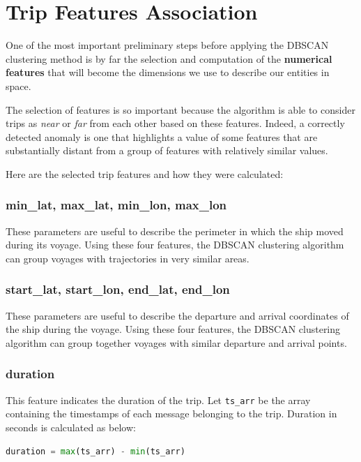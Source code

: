 \section{Trip Features Association}
    One of the most important preliminary steps before applying the DBSCAN clustering method is by far the selection and computation of the \textbf{numerical features} that will become the dimensions we use to describe our entities in space.
     
    The selection of features is so important because the algorithm is able to consider trips as \textit{near} or \textit{far} from each other based on these features. Indeed, a correctly detected anomaly is one that highlights a value of some features that are substantially distant from a group of features with relatively similar values.
    
    Here are the selected trip features and how they were calculated:
    
    \subsubsection{min\_lat, max\_lat, min\_lon, max\_lon}
        These parameters are useful to describe the perimeter in which the ship moved during its voyage. Using these four features, the DBSCAN clustering algorithm can group voyages with trajectories in very similar areas.
    
    \subsubsection{start\_lat, start\_lon, end\_lat, end\_lon}
        These parameters are useful to describe the departure and arrival coordinates of the ship during the voyage. Using these four features, the DBSCAN clustering algorithm can group together voyages with similar departure and arrival points.
    
    \subsubsection{duration}
    
        This feature indicates the duration of the trip. Let \verb|ts_arr| be the array containing the timestamps of each message belonging to the trip. Duration in seconds is calculated as below:
        
        \begin{lstlisting}[language=Python]
duration = max(ts_arr) - min(ts_arr)
        \end{lstlisting}
        
